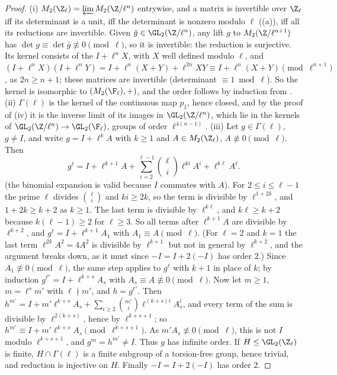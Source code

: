\begin{proof}
(i) $M_2(\Z_\ell)=\varprojlim M_2(\Z/\ell^n)$ entrywise, and a matrix is invertible over $\Z_\ell$ iff its determinant is a unit, iff the determinant is nonzero modulo $\ell$
((a)), iff all its reductions are invertible. Given $\bar g\in\GL_2(\Z/\ell^n)$, any lift $g$ to $M_2(\Z/\ell^{n+1})$ has $\det g\equiv\det\bar g\not\equiv0\pmod\ell$,
so it is invertible: the reduction is surjective. Its kernel consists of the $I+\ell^nX$, with $X$ well defined modulo $\ell$, and $(I+\ell^nX)(I+\ell^nY)=I+\ell^n(X+Y)+\ell^{2n}XY
\equiv I+\ell^n(X+Y)\pmod{\ell^{n+1}}$, as $2n\ge n+1$; these matrices are invertible (determinant $\equiv1\bmod\ell$). So the kernel is isomorphic to $(M_2(\F_\ell),+)$, and the
order follows by induction from . (ii) $\Gamma(\ell)$ is the kernel of the continuous map $p_1$, hence closed, and by the proof of
(iv) it is the inverse limit of its images in $\GL_2(\Z/\ell^n)$, which lie in the kernels of $\GL_2(\Z/\ell^n)\to\GL_2(\F_\ell)$, groups of order
$\ell^{4(n-1)}$. (iii) Let $g\in\Gamma(\ell)$, $g\ne I$, and write $g=I+\ell^kA$ with $k\ge1$ and $A\in M_2(\Z_\ell)$, $A\not\equiv0\pmod\ell$. Then
\[
g^\ell=I+\ell^{k+1}A+\sum_{i=2}^{\ell-1}\binom\ell i\ell^{ki}A^i+\ell^{k\ell}A^\ell .
\]
(the binomial expansion is valid because $I$ commutes with $A$). For $2\le i\le\ell-1$ the prime $\ell$ divides $\binom\ell i$ and $ki\ge2k$, so the term is
divisible by $\ell^{1+2k}$, and $1+2k\ge k+2$ as $k\ge1$. The last term is divisible by $\ell^{k\ell}$, and $k\ell\ge k+2$ because $k(\ell-1)\ge2$ for $\ell\ge3$. So all
terms after $\ell^{k+1}A$ are divisible by $\ell^{k+2}$, and $g^\ell=I+\ell^{k+1}A_1$ with $A_1\equiv A\pmod\ell$. (For $\ell=2$ and $k=1$ the last term $\ell^{2k}A^2=4A^2$ is
divisible by $\ell^{k+1}$ but not in general by $\ell^{k+2}$, and the argument breaks down, as it must since $-I=I+2(-I)$ has order $2$.) Since $A_1\not\equiv0\pmod\ell$, the same step applies to $g^\ell$ with $k+1$ in place of
$k$; by induction $g^{\ell^s}=I+\ell^{k+s}A_s$ with $A_s\equiv A\not\equiv0\pmod\ell$. Now let $m\ge1$, $m=\ell^sm'$ with $\ell\nmid m'$, and $h=g^{\ell^s}$. Then
$h^{m'}=I+m'\ell^{k+s}A_s+\sum_{i\ge2}\binom{m'}i\ell^{(k+s)i}A_s^i$, and every term of the sum is divisible by $\ell^{2(k+s)}$, hence by $\ell^{k+s+1}$; so
$h^{m'}\equiv I+m'\ell^{k+s}A_s\pmod{\ell^{k+s+1}}$. As $m'A_s\not\equiv0\pmod\ell$, this is not $I$ modulo $\ell^{k+s+1}$, and $g^m=h^{m'}\ne I$. Thus $g$
has infinite order. If $H\le\GL_2(\Z_\ell)$ is finite, $H\cap\Gamma(\ell)$ is a finite subgroup of a torsion-free group, hence trivial, and reduction is injective on $H$.
Finally $-I=I+2(-I)$ has order $2$.
\end{proof}

